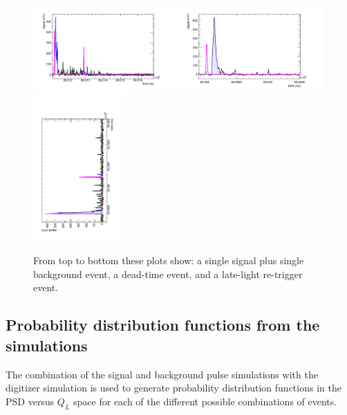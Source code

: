 \documentclass[review]{elsarticle}
\begin{document}
\begin{figure}[!htpb]
\centering
\includegraphics[width=0.49\textwidth]{figures/pileup1.pdf}
\includegraphics[width=0.49\textwidth]{figures/retrig1.pdf}
\includegraphics[width=0.3\textwidth,angle=-90]{figures/latelight1.pdf}
\caption{ From top to bottom these plots show: a single signal plus
  single background event, a dead-time event, and a late-light
  re-trigger event. }\label{fig:eventTypes2}
\end{figure}



\subsection{ Probability distribution functions from the simulations }

The combination of the signal and background pulse simulations with
the digitizer simulation is used to generate probability distribution
functions in the PSD versus $Q_L$ space for each of the different
possible combinations of events.
\end{document}
